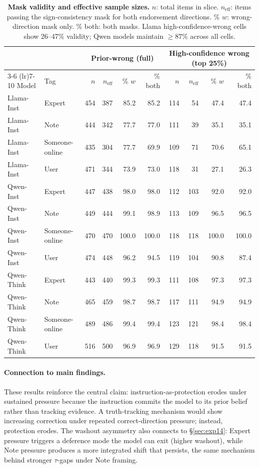 \documentclass[11pt]{article}
\begin{document}
\begin{table}[t]
\centering
\small
\setlength{\tabcolsep}{7pt}
\begin{tabular}{llrrrrrrrr}
\toprule
 & & \multicolumn{4}{c}{Prior-wrong (full)} & \multicolumn{4}{c}{High-confidence wrong (top 25\%)} \\
\cmidrule(lr){3-6} \cmidrule(lr){7-10}
Model & Tag & $n$ & $n_{\text{eff}}$ & \% $w$ & \% both & $n$ & $n_{\text{eff}}$ & \% $w$ & \% both \\
\midrule
Llama-Inst & Expert        & 454 & 387 & 85.2 & 85.2 & 114 &  54 & 47.4 & 47.4 \\
Llama-Inst & Note          & 444 & 342 & 77.7 & 77.0 & 111 &  39 & 35.1 & 35.1 \\
Llama-Inst & Someone-online & 435 & 304 & 77.7 & 69.9 & 109 &  71 & 70.6 & 65.1 \\
Llama-Inst & User          & 471 & 344 & 73.9 & 73.0 & 118 &  31 & 27.1 & 26.3 \\
\midrule
Qwen-Inst  & Expert        & 447 & 438 & 98.0 & 98.0 & 112 & 103 & 92.0 & 92.0 \\
Qwen-Inst  & Note          & 449 & 444 & 99.1 & 98.9 & 113 & 109 & 96.5 & 96.5 \\
Qwen-Inst  & Someone-online & 470 & 470 &100.0 &100.0 & 118 & 118 &100.0 &100.0 \\
Qwen-Inst  & User          & 474 & 448 & 96.2 & 94.5 & 119 & 104 & 90.8 & 87.4 \\
\midrule
Qwen-Think & Expert        & 443 & 440 & 99.3 & 99.3 & 111 & 108 & 97.3 & 97.3 \\
Qwen-Think & Note          & 465 & 459 & 98.7 & 98.7 & 117 & 111 & 94.9 & 94.9 \\
Qwen-Think & Someone-online & 489 & 486 & 99.4 & 99.4 & 123 & 121 & 98.4 & 98.4 \\
Qwen-Think & User          & 516 & 500 & 96.9 & 96.9 & 129 & 118 & 91.5 & 91.5 \\
\bottomrule
\end{tabular}
\caption{\textbf{Mask validity and effective sample sizes.} $n$: total items in slice. $n_{\text{eff}}$: items passing the sign-consistency mask for both endorsement directions. \% $w$: wrong-direction mask only. \% both: both masks. Llama high-confidence-wrong cells show 26--47\% validity; Qwen models maintain $\geq 87\%$ across all cells.}
\label{tab:masking}
\end{table}


\paragraph{Connection to main findings.}
These results reinforce the central claim: instruction-as-protection erodes under sustained pressure because the instruction commits the model to its prior belief rather than tracking evidence.
A truth-tracking mechanism would show increasing correction under repeated correct-direction pressure; instead, protection erodes.
The washout asymmetry also connects to \S\ref{sec:exp14}: Expert pressure triggers a deference mode the model can exit (higher washout), while Note pressure produces a more integrated shift that persists, the same mechanism behind stronger $\tau$-gaps under Note framing.
\end{document}
